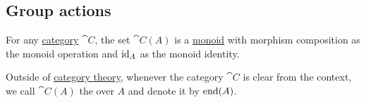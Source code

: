 \subsection{Group actions}\label{subsec:group_actions}

\begin{definition}\label{def:endomorphism_monoid}
  For any \hyperref[def:category]{category} \( \cat{C} \), the set \( \cat{C}(A) \) is a \hyperref[def:unital_magma/monoid]{monoid} with morphism composition as the monoid operation and \( \operatorname{id}_A \) as the monoid identity.

  Outside of \hyperref[sec:category_theory]{category theory}, whenever the category \( \cat{C} \) is clear from the context, we call \( \cat{C}(A) \) the  over \( A \) and denote it by \( \operatorname{end}(A) \).
\end{definition}


